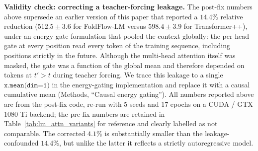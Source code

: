 \documentclass[fleqn,10pt]{article}
\begin{document}
\textbf{Validity check: correcting a teacher-forcing leakage.} The
post-fix numbers above supersede an earlier version of this paper
that reported a $14.4\%$ relative reduction ($512.5 \pm 3.6$ for
FoldFlow-LM versus $598.4 \pm 3.9$ for Transformer++), under an
energy-gate formulation that pooled the context globally: the
per-head gate at every position read every token of the training
sequence, including positions strictly in the future. Although the
multi-head attention itself was masked, the gate was a function of
the global mean and therefore depended on tokens at $t' > t$ during
teacher forcing. We trace this leakage to a single
$\texttt{x.mean(dim=1)}$ in the energy-gating implementation and
replace it with a causal cumulative mean (Methods, ``Causal energy
gating''). All numbers reported above are from the post-fix
code, re-run with 5 seeds and 17 epochs on a CUDA / GTX 1080 Ti
backend; the pre-fix numbers are retained in
Table~\ref{tab:lm_attn_variants} for reference and clearly labelled
as not comparable. The corrected $4.1\%$ is substantially smaller
than the leakage-confounded $14.4\%$, but unlike the latter it
reflects a strictly autoregressive model.
\end{document}
